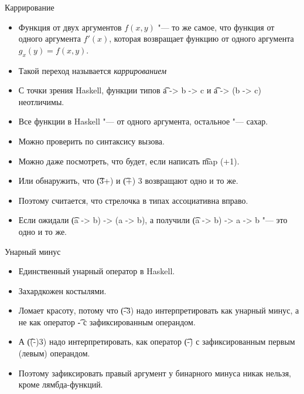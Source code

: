 \begin{frame}{Каррирование}
	\begin{itemize}
		\item Функция от двух аргументов $f(x, y)$ "--- то же самое, что функция от одного аргумента $f'(x)$,
			которая возвращает функцию от одного аргумента $g_x(y)=f(x, y)$.
		\item Такой переход называется \textit{каррированием}
		\item С точки зрения Haskell, функции типов \t{a -> b -> c} и \t{a -> (b -> c)} неотличимы.
		\item Все функции в Haskell "--- от одного аргумента, остальное "--- сахар.
		\item Можно проверить по синтаксису вызова.
		\item Можно даже посмотреть, что будет, если написать \t{map (+1)}.
		\item Или обнаружить, что \t{(3+)} и \t{(+) 3} возвращают одно и то же.
		\item Поэтому считается, что стрелочка в типах ассоциативна вправо.
		\item Если ожидали \t{(a -> b) -> (a -> b)}, а получили \t{(a -> b) -> a -> b} "--- это одно и то же.
	\end{itemize}
\end{frame}

\begin{frame}{Унарный минус}
	\begin{itemize}
		\item Единственный унарный оператор в Haskell.
		\item Захардкожен костылями.
		\item Ломает красоту, потому что \t{(-3)} надо интерпретировать как унарный минус, а не как оператор \t{-} с зафиксированным операндом.
		\item А \t{((-)3)} надо интерпретировать, как оператор \t{(-)} с зафиксированным первым (левым) операндом.
		\item Поэтому зафиксировать правый аргумент у бинарного минуса никак нельзя, кроме лямбда-функций.
	\end{itemize}
\end{frame}

